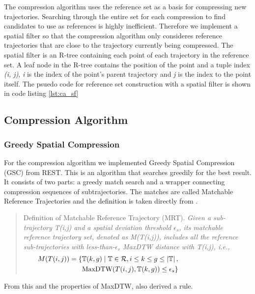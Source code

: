 The compression algorithm uses the reference set as a basis for compressing new trajectories. Searching through the entire set for each compression to find candidates to use as references is highly inefficient. Therefore we implement a spatial filter so that the compression algorithm only consideres reference trajectories that are close to the trajectory currently being compressed. The spatial filter is an R-tree containing each point of each trajectory in the reference set. A leaf node in the R-tree contains the position of the point and a tuple index \textit{(i, j)}, \textit{i} is the index of the point's parent trajectory and \textit{j} is the index to the point itself. The psuedo code for reference set construction with a spatial filter is shown in code listing \ref{lst:ca_sf}

\subsection{Compression Algorithm}
\subsubsection{Greedy Spatial Compression}
For the compression algorithm we implemented Greedy Spatial Compression \break (GSC) from REST. This is an algorithm that searches greedily for the best result. It consists of two parts: a greedy match search and a wrapper connecting compression sequences of subtrajectories.
The matches are called Matchable Reference Trajectories and the definition is taken directly from \textcite{zhao2018rest}.
\begin{quote}
    Definition of Matchable Reference Trajectory (MRT). \textit{Given a sub-trajectory T(i,j) and a spatial deviation threshold $\epsilon_{s}$, its matchable reference trajectory set, denoted as M(T(i,j)), includes all the reference sub-trajectories with less-than-$\epsilon_{s}$ MaxDTW distance with T(i,j), i.e.,}
    \begin{align*}
        \hspace*{-3cm} M(T(i,j)) = \{ & \mathbb{T}(k,g) \mid \mathbb{T} \in \mathcal{R}, i \leq k \leq g \leq \left\lvert \mathbb{T} \right\rvert, \\
        \hspace*{-3cm}                & \text{MaxDTW}(T(i,j), \mathbb{T}(k,g)) \leq \epsilon_{s} \}
    \end{align*}
\end{quote}
From this and the properties of MaxDTW, \textcite{zhao2018rest} also derived a rule.

